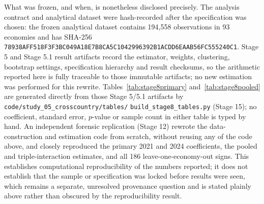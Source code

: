 What was frozen, and when, is nonetheless disclosed precisely. The analysis contract and
analytical dataset were hash-recorded after the specification was chosen: the frozen
analytical dataset contains 194,558 observations in 93 economies and has SHA-256
\texttt{78938AFF518F3F3BC049A18E7B8CA5C1042996392B1ACDD6EAAB56FC555240C1}. Stage 5 and
Stage 5.1 result artifacts record the estimator, weights, clustering, bootstrap settings,
specification hierarchy and result checksums, so the arithmetic reported here is fully
traceable to those immutable artifacts; no new estimation was performed for this rewrite.
Tables~\ref{tab:stage8primary} and~\ref{tab:stage8pooled} are generated directly from
those Stage 5/5.1 artifacts by \texttt{code/study\_05\_crosscountry/tables/}
\texttt{build\_stage8\_tables.py} (Stage 15); no coefficient, standard error, $p$-value or
sample count in either table is typed by hand.
An independent forensic replication (Stage 12) rewrote the data-construction and
estimation code from scratch, without reusing any of the code above, and closely
reproduced the primary 2021 and 2024 coefficients, the pooled and triple-interaction
estimates, and all 186 leave-one-economy-out signs. This establishes computational
reproducibility of the numbers reported; it does not establish that the sample or
specification was locked before results were seen, which remains a separate, unresolved
provenance question and is stated plainly above rather than obscured by the reproducibility
result.
